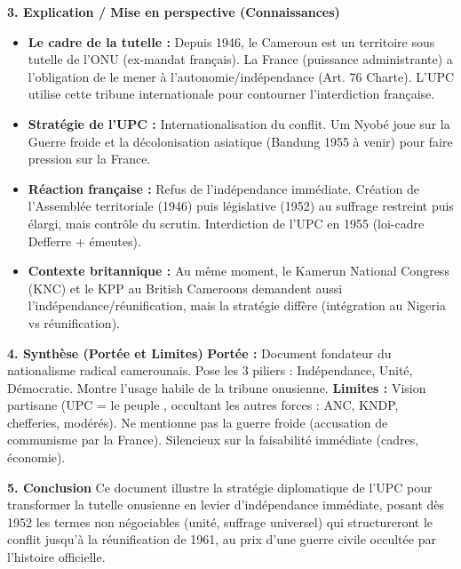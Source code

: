 \documentclass[11pt]{article}
\newcommand{\cle}[1]{{\popxbold\color{popdark}#1}}
\begin{document}
\begin{exoresolu}
\textbf{3. Explication / Mise en perspective (Connaissances)}
\begin{itemize}
    \item \textbf{Le cadre de la tutelle :} Depuis 1946, le Cameroun est un \cle{territoire sous tutelle} de l'ONU (ex-mandat français). La France (puissance administrante) a l'obligation de le mener à l'autonomie/indépendance (Art. 76 Charte). L'UPC utilise cette tribune internationale pour contourner l'interdiction française.
    \item \textbf{Stratégie de l'UPC :} \cle{Internationalisation} du conflit. Um Nyobé joue sur la Guerre froide et la décolonisation asiatique (Bandung 1955 à venir) pour faire pression sur la France.
    \item \textbf{Réaction française :} Refus de l'indépendance immédiate. Création de l'Assemblée territoriale (1946) puis législative (1952) au suffrage restreint puis élargi, mais contrôle du scrutin. Interdiction de l'UPC en 1955 (loi-cadre Defferre + émeutes).
    \item \textbf{Contexte britannique :} Au même moment, le Kamerun National Congress (KNC) et le KPP au British Cameroons demandent aussi l'indépendance/réunification, mais la stratégie diffère (intégration au Nigeria vs réunification).
\end{itemize}

\textbf{4. Synthèse (Portée et Limites)}
\textbf{Portée :} Document fondateur du \cle{nationalisme radical camerounais}. Pose les 3 piliers : Indépendance, Unité, Démocratie. Montre l'usage habile de la tribune onusienne.
\textbf{Limites :} Vision partisane (UPC = \guillemotleft le peuple \guillemotright, occultant les autres forces : ANC, KNDP, chefferies, modérés). Ne mentionne pas la guerre froide (accusation de communisme par la France). Silencieux sur la faisabilité immédiate (cadres, économie).

\textbf{5. Conclusion}
Ce document illustre la \cle{stratégie diplomatique de l'UPC} pour transformer la tutelle onusienne en levier d'indépendance immédiate, posant dès 1952 les termes non négociables (unité, suffrage universel) qui structureront le conflit jusqu'à la réunification de 1961, au prix d'une guerre civile occultée par l'histoire officielle.
\end{exoresolu}
\end{document}

